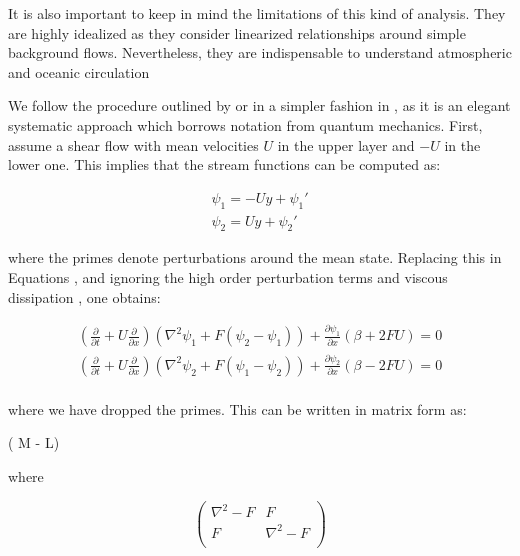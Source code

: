 It is also important to keep in mind the limitations of this kind of analysis. They are highly idealized as they consider linearized relationships around simple background flows. Nevertheless, they are indispensable to understand atmospheric and oceanic circulation

We follow the procedure outlined by  or in a simpler fashion in , as it is an elegant systematic approach which borrows notation from quantum mechanics. First, assume a shear flow with mean velocities $U$ in the upper layer and $-U$ in the lower one. This implies that the stream functions can be computed as:

\begin{eqnarray}
\psi_1 = -U y + \psi_1' \nonumber \\
\psi_2 =  U y + \psi_2' \label{psi_base}
\end{eqnarray}

where the primes denote perturbations around the mean state. Replacing this in Equations , and ignoring the high order perturbation terms and viscous dissipation , one obtains:

\begin{eqnarray}
\left(\frac{\partial}{\partial t}+U \frac{\partial}{\partial x}\right)\left(\nabla^2 \psi_1 + F(\psi_2-\psi_1)\right) +\frac{\partial \psi_1}{\partial x}(\beta + 2FU) = 0 \nonumber \\
\left(\frac{\partial}{\partial t}+U \frac{\partial}{\partial x}\right)\left(\nabla^2 \psi_2 + F(\psi_1-\psi_2)\right) +\frac{\partial \psi_2}{\partial x}(\beta - 2FU) = 0 \nonumber \\
\end{eqnarray}

where we have dropped the primes. This can be written in matrix form as:

\beq
\left( M - L\right) 

where

\begin{equation}
\begin{pmatrix}
  \nabla ^2 - F & F \\
  F & \nabla^2 - F \\
\end{pmatrix}
\label{Mmatrix}
\end{equation}

